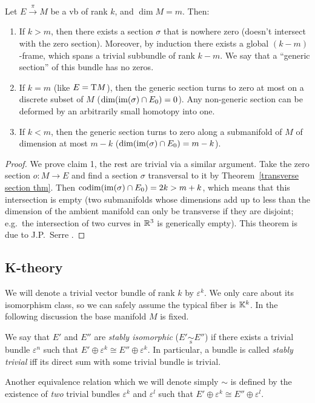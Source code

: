\begin{cor}
Let $E\overset{\pi}{\to} M$ be a \gls{vb} of rank $k$, and $\dim M=m$. Then:
\begin{enumerate}
    \item If $k>m$, then there exists a section $\sigma$ that is nowhere zero (doesn't intersect with the zero section). Moreover, by induction there exists a global $(k-m)$-frame, which spans a trivial subbundle of rank $k-m$. We say that a ``generic section'' of this bundle has no zeros.
    \item If $k=m$ (like $E=\mathrm{T} M$), then the generic section turns to zero at most on a discrete subset of $M$ ($\dim(\operatorname{im}(\sigma)\cap E_0)=0$). Any non-generic section can be deformed by an arbitrarily small homotopy into one.
    \item If $k<m$, then the generic section turns to zero along a submanifold of $M$ of dimension at most $m-k$ ($\dim(\operatorname{im}(\sigma)\cap E_0)=m-k$). 
\end{enumerate}
\end{cor}
\begin{proof}
    We prove claim 1, the rest are trivial via a similar argument. Take the zero section $o:M\to E$ and find a   section $\sigma$ transversal to it by Theorem~\ref{transverse section thm}. Then $\operatorname{codim}(\operatorname{im} (\sigma)\cap E_0)=2k>m+k$, which means that this intersection is empty (two submanifolds whose dimensions add up to less than the dimension of the ambient manifold can only be transverse if they are disjoint; e.g.\ the intersection of two curves in $\mathbb{R}^3$ is generically empty). This theorem is due to J.P.~Serre \cite[Thm.~2]{Atiyah}.
\end{proof}






\subsection{K-theory}

We will denote a trivial vector bundle of rank $k$ by $\varepsilon^k$. We only care about its isomorphism class, so we can safely assume the typical fiber is $\mathbb{K}^k$. In the following discussion the base manifold $M$ is fixed.

\begin{defn}
We say that $E'$ and $E''$ are \emph{stably isomorphic} ($E'\underset{\mathrm{s}}{\sim}E''$) if there exists a trivial bundle $\varepsilon^n$ such that $E'\oplus \varepsilon^k \cong E''\oplus\varepsilon^k$. In particular, a bundle is called \emph{stably trivial} iff its direct sum with some trivial bundle is trivial.

Another equivalence relation which we will denote simply $\sim$ is defined by the existence of \emph{two} trivial bundles $\varepsilon^k$ and $\varepsilon^l$ such that $E'\oplus \varepsilon^k\cong E''\oplus \varepsilon^l$.
\end{defn}

